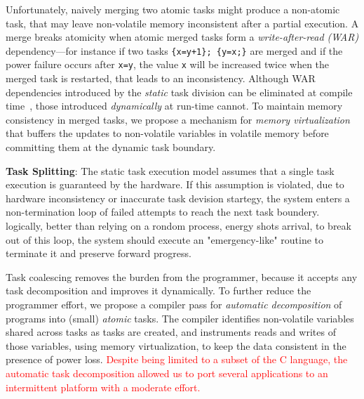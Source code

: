 Unfortunately, naively merging two atomic tasks might produce a non-atomic task, that may leave non-volatile memory inconsistent after a partial execution. A merge breaks atomicity when atomic merged tasks form a \emph{write-after-read (WAR)} dependency---for instance if two tasks \texttt{\{x=y+1\}; \{y=x;\}} are merged and if the power failure occurs after \texttt{x=y}, the value \texttt{x} will be increased twice when the merged task is restarted, that leads to an inconsistency.
%
%
Although WAR dependencies introduced by the \emph{static} task division can be eliminated at compile time~\citep{alpaca}, those introduced \emph{dynamically} at
run-time cannot. To maintain memory consistency in merged tasks, we propose a
mechanism for \emph{memory virtualization} that buffers the updates to non-volatile variables in volatile memory before committing them at the dynamic task boundary.
%

\textbf{Task Splitting}: The static task execution model assumes that a single task execution is guaranteed by the hardware. If this assumption is violated, due to hardware inconsistency or inaccurate task devision startegy, the system enters a non-termination loop of failed attempts to reach the next task boundery. logically, better than relying on a rondom process, energy shots arrival, to break out of this loop, the system should execute an "emergency-like" routine to terminate it and preserve forward progress.

Task coalescing removes the burden from the programmer, because it accepts any task decomposition and improves it dynamically. To further reduce the programmer effort, we propose a compiler pass for \emph{automatic decomposition} of programs into (small) \emph{atomic} tasks. The compiler identifies non-volatile variables shared across tasks as tasks are created, and instruments reads and writes of those variables, using memory virtualization, to keep the data consistent in the presence of power loss. \textcolor{red}{Despite being limited to a subset of the C language, the automatic task decomposition allowed us to port several	applications to an intermittent platform with a moderate effort.}

